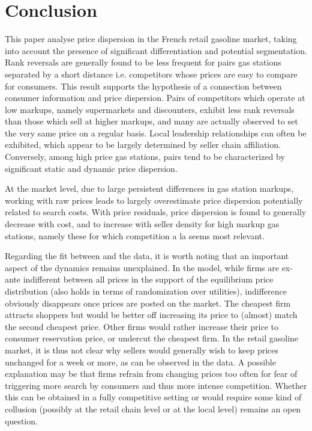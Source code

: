\documentclass[english]{article}
\begin{document}
\section{Conclusion}

This paper analyse price dispersion in the French retail gasoline market, taking into account the presence of significant differentiation and potential segmentation. Rank reversals are generally found to be less frequent for pairs gas stations separated by a short distance i.e. competitors whose prices are easy to compare for consumers. This result supports the hypothesis of a connection between consumer information and price dispersion. Pairs of competitors which operate at low markups, namely supermarkets and discounters, exhibit less rank reversals than those which sell at higher markups, and many are actually observed to set the very same price on a regular basis. Local leadership relationships can often be exhibited, which appear to be largely determined by seller chain affiliation. Conversely, among high price gas stations, pairs tend to be characterized by significant static and dynamic price dispersion.

At the market level, due to large persistent differences in gas station markups, working with raw prices leads to largely overestimate price dispersion potentially related to search costs. With price residuals, price dispersion is found to generally decrease with cost, and to increase with seller density for high markup gas stations, namely these for which competition a la \cite{VAR80} seems most relevant.

Regarding the fit between \cite{VAR80} and the data, it is worth noting that an important aspect of the dynamics remains unexplained. In the model, while firms are ex-ante indifferent between all prices in the support of the equilibrium price distribution (also holds in terms of randomization over utilities), indifference obviously disappears once prices are posted on the market. The cheapest firm attracts shoppers but would be better off increasing its price to (almost) match the second cheapest price. Other firms would rather increase their price to consumer reservation price, or undercut the cheapest firm. In the retail gasoline market, it is thus not clear why sellers would generally wish to keep prices unchanged for a week or more, as can be observed in the data. A possible explanation may be that firms refrain from changing prices too often for fear of triggering more search by consumers and thus more intense competition. Whether this can be obtained in a fully competitive setting  or would require some kind of collusion (possibly at the retail chain level or at the local level) remains an open question.
\end{document}
